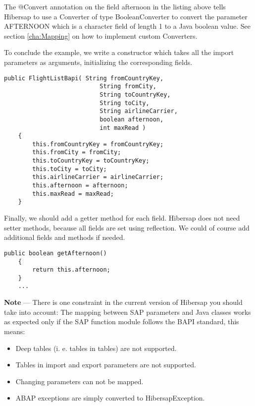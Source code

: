 The @Convert annotation on the field afternoon in the listing above tells Hibersap
to use a Converter of type BooleanConverter to convert the parameter AFTERNOON which is a character field of length 1 to a
Java boolean value. See section \ref{cha:Mapping} on how to implement custom Converters.

To conclude the example, we write a constructor which takes all the import parameters as arguments,
initializing the corresponding fields.

\begin{Verbatim}[frame=single,label=The constructor,samepage=true]
    public FlightListBapi( String fromCountryKey,
                           String fromCity,
                           String toCountryKey,
                           String toCity,
                           String airlineCarrier,
                           boolean afternoon,
                           int maxRead )
    {
        this.fromCountryKey = fromCountryKey;
        this.fromCity = fromCity;
        this.toCountryKey = toCountryKey;
        this.toCity = toCity;
        this.airlineCarrier = airlineCarrier;
        this.afternoon = afternoon;
        this.maxRead = maxRead;
    }
\end{Verbatim}

Finally, we should add a getter method for each field.
Hibersap does not need setter methods, because all fields are set using reflection.
We could of course add additional fields and methods if needed.

\begin{Verbatim}[frame=single,label=The getter methods]
    public boolean getAfternoon()
    {
        return this.afternoon;
    }
    ...
\end{Verbatim}

\HRule

\textbf{Note} --- There is one constraint in the current version of Hibersap you should take into account: The mapping
between SAP parameters and Java classes works as expected only if the SAP function module follows the BAPI standard,
this means:
\begin{itemize}
  \item Deep tables (i. e. tables in tables) are not supported.
  \item Tables in import and export parameters are not supported.
  \item Changing parameters can not be mapped.
  \item ABAP exceptions are simply converted to HibersapException.
\end{itemize}

